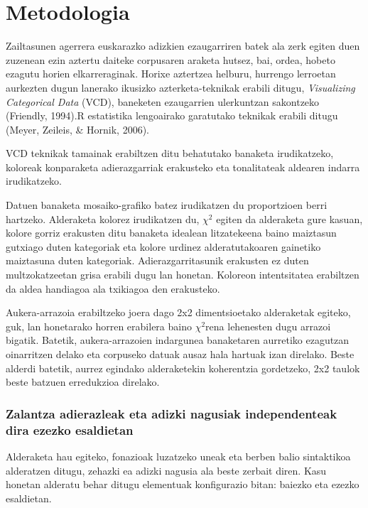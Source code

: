 \documentclass[]{article}
\begin{document}
\section{Metodologia}\label{metodologia}

Zailtasunen agerrera euskarazko adizkien ezaugarriren batek ala zerk
egiten duen zuzenean ezin aztertu daiteke corpusaren araketa hutsez,
bai, ordea, hobeto ezagutu horien elkarreraginak. Horixe aztertzea
helburu, hurrengo lerroetan aurkezten dugun lanerako ikusizko
azterketa-teknikak erabili ditugu, \emph{Visualizing Categorical Data}
(VCD), baneketen ezaugarrien ulerkuntzan sakontzeko (Friendly, 1994).R
estatistika lengoairako garatutako teknikak erabili ditugu (Meyer,
Zeileis, \& Hornik, 2006).

VCD teknikak tamainak erabiltzen ditu behatutako banaketa irudikatzeko,
koloreak konparaketa adierazgarriak erakusteko eta tonalitateak aldearen
indarra irudikatzeko.

Datuen banaketa mosaiko-grafiko batez irudikatzen du proportzioen berri
hartzeko. Alderaketa kolorez irudikatzen du, \(\chi^2\) egiten da
alderaketa gure kasuan, kolore gorriz erakusten ditu banaketa idealean
litzatekeena baino maiztasun gutxiago duten kategoriak eta kolore
urdinez alderatutakoaren gainetiko maiztasuna duten kategoriak.
Adierazgarritasunik erakusten ez duten multzokatzeetan grisa erabili
dugu lan honetan. Koloreon intentsitatea erabiltzen da aldea handiagoa
ala txikiagoa den erakusteko.

Aukera-arrazoia erabiltzeko joera dago 2x2 dimentsioetako alderaketak
egiteko, guk, lan honetarako horren erabilera baino \(\chi^2\)rena
lehenesten dugu arrazoi bigatik. Batetik, aukera-arrazoien indargunea
banaketaren aurretiko ezagutzan oinarritzen delako eta corpuseko datuak
ausaz hala hartuak izan direlako. Beste alderdi batetik, aurrez egindako
alderaketekin koherentzia gordetzeko, 2x2 taulok beste batzuen
erredukzioa direlako.

\subsubsection{Zalantza adierazleak eta adizki nagusiak independenteak
dira ezezko
esaldietan}\label{zalantza-adierazleak-eta-adizki-nagusiak-independenteak-dira-ezezko-esaldietan}

Alderaketa hau egiteko, fonazioak luzatzeko uneak eta berben balio
sintaktikoa alderatzen ditugu, zehazki ea adizki nagusia ala beste
zerbait diren. Kasu honetan alderatu behar ditugu elementuak
konfigurazio bitan: baiezko eta ezezko esaldietan.
\end{document}
